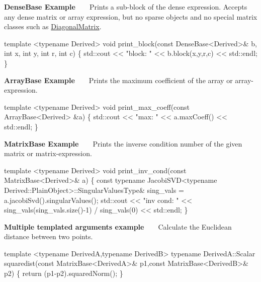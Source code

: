 {\bfseries  Dense\+Base Example }~\newline
~\newline
 Prints a sub-\/block of the dense expression. Accepts any dense matrix or array expression, but no sparse objects and no special matrix classes such as \hyperlink{group___core___module_class_eigen_1_1_diagonal_matrix}{Diagonal\+Matrix}. 
\begin{DoxyCode}
\textcolor{keyword}{template} <\textcolor{keyword}{typename} Derived>
\textcolor{keywordtype}{void} print\_block(\textcolor{keyword}{const} DenseBase<Derived>& b, \textcolor{keywordtype}{int} x, \textcolor{keywordtype}{int} y, \textcolor{keywordtype}{int} r, \textcolor{keywordtype}{int} c)
\{
  std::cout << \textcolor{stringliteral}{"block: "} << b.block(x,y,r,c) << std::endl;
\}
\end{DoxyCode}
 {\bfseries  Array\+Base Example }~\newline
~\newline
 Prints the maximum coefficient of the array or array-\/expression. 
\begin{DoxyCode}
\textcolor{keyword}{template} <\textcolor{keyword}{typename} Derived>
\textcolor{keywordtype}{void} print\_max\_coeff(\textcolor{keyword}{const} ArrayBase<Derived> &a)
\{
  std::cout << \textcolor{stringliteral}{"max: "} << a.maxCoeff() << std::endl;
\}
\end{DoxyCode}
 {\bfseries  Matrix\+Base Example }~\newline
~\newline
 Prints the inverse condition number of the given matrix or matrix-\/expression. 
\begin{DoxyCode}
\textcolor{keyword}{template} <\textcolor{keyword}{typename} Derived>
\textcolor{keywordtype}{void} print\_inv\_cond(\textcolor{keyword}{const} MatrixBase<Derived>& a)
\{
  \textcolor{keyword}{const} \textcolor{keyword}{typename} JacobiSVD<typename Derived::PlainObject>::SingularValuesType&
    sing\_vals = a.jacobiSvd().singularValues();
  std::cout << \textcolor{stringliteral}{"inv cond: "} << sing\_vals(sing\_vals.size()-1) / sing\_vals(0) << std::endl;
\}
\end{DoxyCode}
 {\bfseries  Multiple templated arguments example }~\newline
~\newline
 Calculate the Euclidean distance between two points. 
\begin{DoxyCode}
\textcolor{keyword}{template} <\textcolor{keyword}{typename} DerivedA,\textcolor{keyword}{typename} DerivedB>
\textcolor{keyword}{typename} DerivedA::Scalar squaredist(\textcolor{keyword}{const} MatrixBase<DerivedA>& p1,\textcolor{keyword}{const} MatrixBase<DerivedB>& p2)
\{
  \textcolor{keywordflow}{return} (p1-p2).squaredNorm();
\}
\end{DoxyCode}
